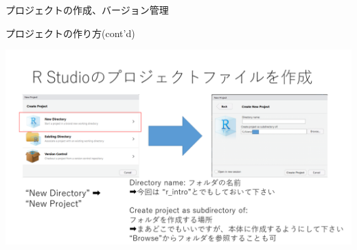 \documentclass[
  ignorenonframetext,
]{beamer}
\begin{document}
\begin{frame}{プロジェクトの作成、バージョン管理}
\begin{block}{プロジェクトの作り方(cont'd)}
\protect\hypertarget{ux30d7ux30edux30b8ux30a7ux30afux30c8ux306eux4f5cux308aux65b9contd}{}
\begin{center}\includegraphics[width=0.95\linewidth]{figs/create_repository2} \end{center}
\end{block}
\end{frame}
\end{document}
